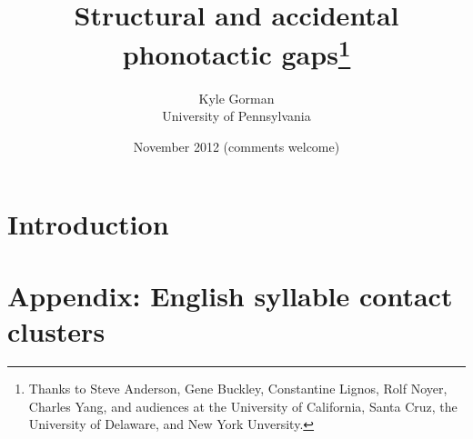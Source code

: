 \documentclass[12pt]{article}
\title{Structural and accidental phonotactic gaps\thanks{
Thanks to Steve Anderson, 
Gene Buckley, 
Constantine Lignos,
Rolf Noyer,
Charles Yang, 
and audiences at    
the University of California, Santa Cruz, 
the University of Delaware, and 
New York Unversity.}}
\author{Kyle Gorman \\ University of Pennsylvania}
\date{November 2012 (comments welcome)}
\begin{document}
\maketitle


\section{Introduction}

\appendix
\renewcommand{\arraystretch}{0.25}


\section{Appendix: English syllable contact clusters}
\label{clusters}
\end{document}
